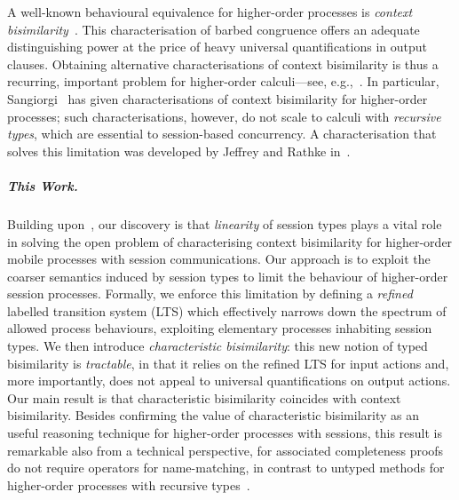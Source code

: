 \documentclass[a4paper,UKenglish]{lipics}
\theoremstyle{definition}
\begin{document}
A well-known behavioural equivalence for higher-order processes
is \emph{context bisimilarity}~\cite{San96H}. This 
 characterisation of %
barbed congruence 
offers an adequate distinguishing power at the price of heavy universal quantifications in output clauses.
Obtaining alternative 
characterisations of context bisimilarity
is thus a recurring, important problem 
for higher-order calculi---see, e.g.,~\cite{SangiorgiD:expmpa,San96H,JeffreyR05,DBLP:journals/cl/KoutavasH12}. %
In particular, Sangiorgi~\cite{SangiorgiD:expmpa,San96H} has 
given %
characterisations of context bisimilarity
for higher-order processes; such 
characterisations, however,  %
do not scale to  
  calculi with \emph{recursive types}, which %
  are essential to %
session-based concurrency. A characterisation  
that solves this limitation was developed by Jeffrey and Rathke in~\cite{JeffreyR05}.

\subparagraph{This Work.}
Building upon~\cite{SangiorgiD:expmpa,San96H,JeffreyR05}, 
our discovery is that \emph{linearity} of session types plays a vital role 
in solving 
the %
open problem of characterising context bisimilarity for higher-order mobile processes with session communications.
Our approach is to exploit 
the coarser semantics induced by session types to limit
the behaviour of higher-order session processes. 
 Formally, we enforce this limitation by defining
a \emph{refined} labelled transition system (LTS)
which effectively 
narrows down the spectrum of allowed process behaviours, 
exploiting elementary processes inhabiting session types.
We then introduce \emph{characteristic bisimilarity}: this  
 new notion of typed bisimilarity   is 
\emph{tractable}, in that 
it relies on the refined LTS for input actions and, more importantly, 
does not appeal to universal quantifications on output actions. 
Our main result is that characteristic  %
bisimilarity coincides with context bisimilarity.
Besides confirming the value of characteristic bisimilarity as an useful reasoning technique for 
higher-order processes with sessions,
this result is 
remarkable 
also from a technical perspective, for associated 
completeness proofs do not require 
operators for 
name-matching,
in contrast to untyped methods for  higher-order processes
with recursive types~\cite{JeffreyR05}.
\end{document}
